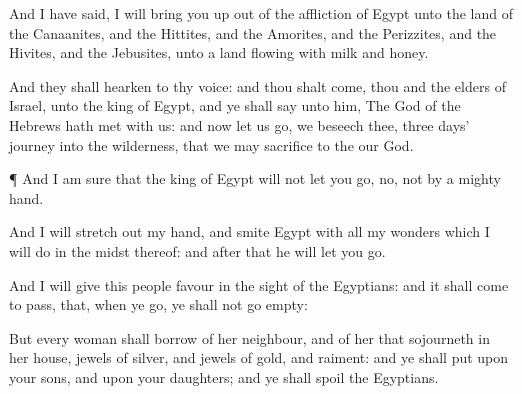 {And I have
said, I will
bring you up out of the
affliction of
Egypt unto the
land of the
Canaanites, and the
Hittites, and the
Amorites, and the
Perizzites, and the
Hivites, and the
Jebusites, unto a
land
flowing with
milk and
honey.

And they shall
hearken to thy
voice: and thou shalt
come, thou and the
elders of
Israel, unto the
king of
Egypt, and ye shall
say unto him, The
{}
God of the
Hebrews hath
met with us: and now let us
go, we beseech thee,
three
days’
journey into the
wilderness, that we may
sacrifice to the
{} our
God.


\par }{\PP {}¶ And I am
sure that the
king of
Egypt will not
let you
go, no, not by a
mighty
hand.

And I will stretch
out my
hand, and
smite
Egypt with all my
wonders which I will
do in the
midst thereof: and
after that he will let you
go.

And I will
give this
people
favour in the
sight of the
Egyptians: and it shall come to pass, that, when ye
go, ye shall not
go
empty:

But every
woman shall
borrow of her
neighbour, and of her that
sojourneth in her
house,
jewels of
silver, and
jewels of
gold, and
raiment: and ye shall
put
{} upon your
sons, and upon your
daughters; and ye shall
spoil the
Egyptians.




\par }
